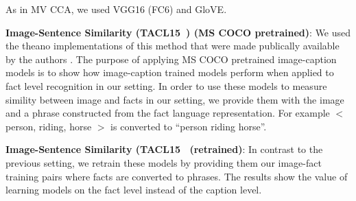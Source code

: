 \documentclass[runningheads]{llncs}
\begin{document}
As in MV CCA,  we used VGG16 (FC6) and GloVE.
     \item \textbf{Image-Sentence Similarity (TACL15~\cite{kiros2014unifying}) (MS COCO pretrained)}: We used the theano implementations of this method that were made publically available by the authors \cite{tacl15_implementation}.
The purpose of applying MS COCO pretrained image-caption models is to show how image-caption trained models perform when applied to fact level recognition in our setting. In order to use these models to measure simility between image and facts in our setting, we provide them with the image and a phrase constructed from the fact language representation. For example $<$person, riding, horse $>$ is converted to ``person riding horse''.
\item \textbf{Image-Sentence Similarity (TACL15~\cite{kiros2014unifying} (retrained)}:  In contrast to the previous setting, we  retrain these models by providing them our image-fact training pairs where facts are converted to phrases.
The results show the value of learning models on the fact level instead of the caption level. %
\begin{comment}
Note that ICLR16~\cite{vendrov2015order} is a very recent work (not yet presented) and although both our models and ~\cite{vendrov2015order} build uses VGG Network, the comparison is complicated since their main contribution is to use order-embedding loss instead of distance loss.  ICLR16~\cite{vendrov2015order} applies the method in TACL15~\cite{kiros2014unifying} but using their proposed order-embedding loss instead of the distance loss used in~\cite{kiros2014unifying}. We keep both the TACL15 and ICLR16 results in this paper as a guide since they are firstly applied in this setting while considering applying order-embedding loss to Model1 and 2 as future work.
\end{comment}
\end{document}
